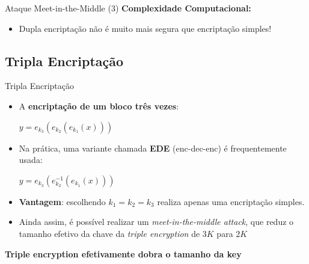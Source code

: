 \documentclass{beamer}
\begin{document}
\begin{frame}{Ataque Meet-in-the-Middle (3)}
    \textbf{Complexidade Computacional:}
    
    \begin{center}
    \end{center}
    
    \vspace{0.5em}
    \begin{itemize}
        \item \alert{Dupla encriptação não é muito mais segura que encriptação simples!}
    \end{itemize}
\end{frame}

\subsection{Tripla Encriptação}

\begin{frame}{Tripla Encriptação}
  \begin{itemize}
    \item A \textbf{encriptação de um bloco três vezes}:
    \begin{center}
        $y = e_{k_3}\left(e_{k_2}\left(e_{k_1}(x)\right)\right)$
    \end{center}
       
    \item Na prática, uma variante chamada \textbf{EDE} (enc-dec-enc) é frequentemente usada:
    \begin{center}
      $y = e_{k_3}\left(e^{-1}_{k_2}\left(e_{k_1}(x)\right)\right)$  
    \end{center}

    \item \textbf{Vantagem}: escolhendo $k_1 = k_2 = k_3$ realiza apenas uma encriptação simples.

    \item Ainda assim, é possível realizar um \textit{meet-in-the-middle attack}, que reduz o tamanho efetivo da chave da \textit{triple encryption} de $3K$ para $2K$

  \end{itemize}
  \begin{center}
    \textbf{Triple encryption efetivamente dobra o tamanho da key}    
  \end{center}
  
\end{frame}
\end{document}
